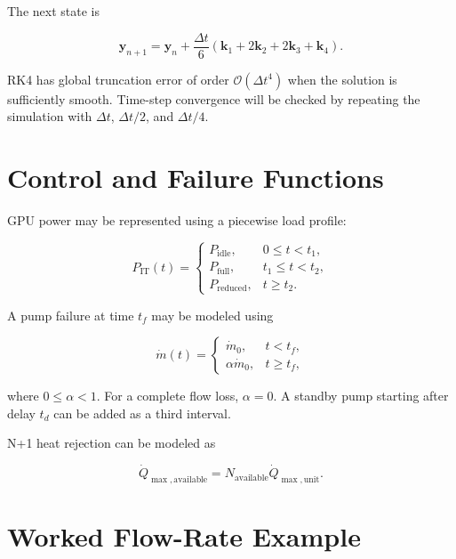 \documentclass[11pt]{article}
\begin{document}
The next state is

\begin{equation}
\mathbf{y}_{n+1}
=\mathbf{y}_n
+\frac{\Delta t}{6}
\left(\mathbf{k}_1+2\mathbf{k}_2+2\mathbf{k}_3+\mathbf{k}_4\right).
\label{eq:rk4}
\end{equation}

RK4 has global truncation error of order \(\mathcal{O}(\Delta t^4)\) when the
solution is sufficiently smooth. Time-step convergence will be checked by repeating
the simulation with \(\Delta t\), \(\Delta t/2\), and \(\Delta t/4\).

\section{Control and Failure Functions}

GPU power may be represented using a piecewise load profile:

\begin{equation}
P_{\mathrm{IT}}(t)=
\begin{cases}
P_{\mathrm{idle}}, & 0\le t<t_1,\\
P_{\mathrm{full}}, & t_1\le t<t_2,\\
P_{\mathrm{reduced}}, & t\ge t_2.
\end{cases}
\end{equation}

A pump failure at time \(t_f\) may be modeled using

\begin{equation}
\dot m(t)=
\begin{cases}
\dot m_0, & t<t_f,\\
\alpha\dot m_0, & t\ge t_f,
\end{cases}
\end{equation}

where \(0\le\alpha<1\). For a complete flow loss, \(\alpha=0\). A standby pump
starting after delay \(t_d\) can be added as a third interval.

N+1 heat rejection can be modeled as

\begin{equation}
\dot Q_{\max,\mathrm{available}}
=N_{\mathrm{available}}\dot Q_{\max,\mathrm{unit}}.
\end{equation}

\section{Worked Flow-Rate Example}
\end{document}
